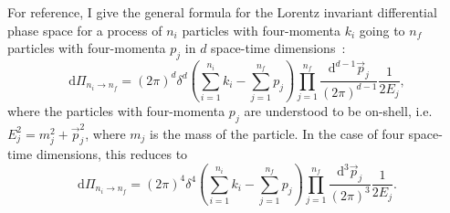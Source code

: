 \documentclass[../main.tex]{subfiles}
\begin{document}
For reference, I give the general formula for the Lorentz invariant differential phase space for a process of \(n_i\) particles with four-momenta \(k_i\) going to \(n_f\) particles with four-momenta \(p_j\) in \(d\) space-time dimensions~\cite{Schwartz:2014sze}:
\begin{equation}
  \label{pc:eq:dPi_d}
  \mathrm{d}\Pi_{n_i \to n_f} =  (2\pi)^d \delta^d(\sum_{i=1}^{n_i} k_i - \sum_{j=1}^{n_f} p_j) \prod_{j=1}^{n_f} \frac{\mathrm{d}^{d-1}\vec{p}_j}{(2\pi)^{d-1}} \frac{1}{2E_j},
\end{equation}
where the particles with four-momenta \(p_j\) are understood to be  on-shell, i.e. \(E_j^2 = m_j^2 + \vec{p}_j^2\), where \(m_j\) is the mass of the particle.
In the case of four space-time dimensions, this reduces to
\begin{equation}
  \label{pc:eq:dPi_4}
  \mathrm{d}\Pi_{n_i \to n_f} =  (2\pi)^4 \delta^4(\sum_{i=1}^{n_i} k_i - \sum_{j=1}^{n_f} p_j) \prod_{j=1}^{n_f} \frac{\mathrm{d}^{3}\vec{p}_j}{(2\pi)^{3}} \frac{1}{2E_j}.
\end{equation}
\end{document}
